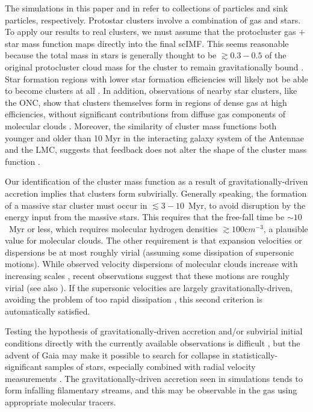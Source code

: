 \documentclass[iop]{emulateapj}
\begin{document}
The simulations in this paper and in \citet{ballesteros15} refer to collections of
particles and sink particles, respectively. Protostar clusters involve a combination of gas and stars.  To apply our results to real
clusters, we must assume 
that the protocluster gas $+$ star mass
function maps directly into the final scIMF.
This seems reasonable because
the total mass in stars is generally thought to
be $\gtrsim 0.3 - 0.5$ of the original protocluster cloud mass
for the cluster to remain gravitationally bound
\citep[unless gas loss is extremely slow;][]
{hills80,mathieu83,geyerburkert01,lada03}. Star formation regions with lower star formation efficiencies will likely not be able to become  clusters at all \citep{kroupa00}. In addition, observations of nearby star clusters, like the ONC, show that clusters themselves form in regions of dense gas at high efficiencies, without significant contributions from diffuse gas components of molecular clouds \citep{hh98}. 
Moreover, the similarity of cluster mass functions
both younger and older than 10 Myr in the interacting galaxy system of the Antennae and
the LMC, suggests that feedback does not alter the shape of the
cluster mass function \citep{fall10}.

Our identification of the cluster mass
function as a result of gravitationally-driven accretion implies that clusters form subvirially.
 Generally speaking, the formation of a massive star cluster must occur in $\lesssim 3-10$~Myr, to avoid disruption by the energy input from the massive stars.  This requires that the free-fall time be $\sim 10$~Myr or less, which requires molecular hydrogen densities $\gtrsim 100 {\mathrm cm^{-3}}$, a plausible value for molecular clouds.  The other requirement is that expansion velocities or dispersions be at most roughly virial (assuming some dissipation of supersonic motions).  While observed velocity dispersions of molecular clouds increase with increasing scales \citep[Larson's first law;][]{larson81}, recent observations suggest that these motions are roughly virial \citep{heyer09}
(see also \citet{larson81}).  If the supersonic velocities are largely gravitationally-driven, avoiding the problem of too rapid dissipation \citep{bp11}, this second criterion is automatically satisfied.

Testing the hypothesis of gravitationally-driven accretion and/or subvirial initial conditions directly with
the currently available observations is difficult \citep{proszkow09,kuznetsova15}, but the advent of Gaia may
make it possible to search for
collapse in statistically-significant
samples of stars, especially combined with radial velocity measurements
\citep{tobin09,kounkel16,dario16}.
The gravitationally-driven accretion seen in simulations tends to form infalling filamentary streams, and this may be observable in the gas using
appropriate molecular tracers.
\end{document}
